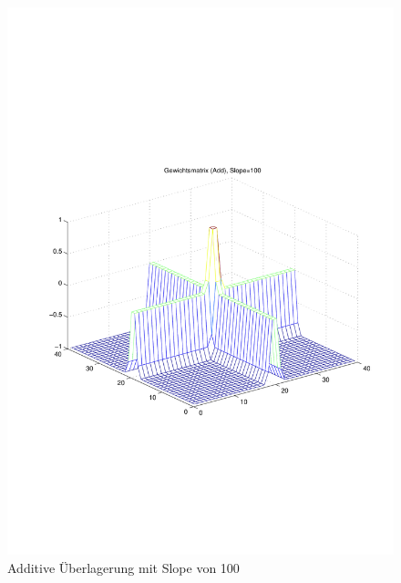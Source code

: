\begin{figure}[hbt]
	\centering
	\includegraphics[width=0.6\linewidth]{./Bilder/Auswertung/Gewichtsmatrix/Gewichtsmatrix_Add_Slope_100}
	\caption{Additive Überlagerung mit Slope von 100}
	\label{Add100}
\end{figure}

\newpage
